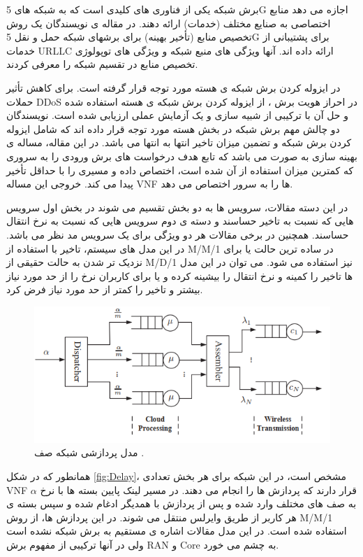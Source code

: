 برش شبکه یکی از فناوری های کلیدی است که به شبکه های 5G اجازه می دهد منابع اختصاصی به صنایع مختلف (خدمات) ارائه دهند.
در مقاله ی
\cite{li2019latency}
نویسندگان یک روش تخصیص منابع (تأخیر بهینه) برای برشهای شبکه حمل و نقل 5G برای پشتیبانی از خدمات URLLC ارائه داده اند.
آنها ویژگی های منبع شبکه و ویژگی های توپولوژی تخصیص منابع در تقسیم شبکه را معرفی کردند.

در 
\citep{vnf1,coreSlice}
ایزوله کردن برش شبکه ی هسته 
مورد توجه قرار گرفته است.
\citep{vnf1}
برای کاهش تأثیر حملات DDoS در احراز هویت برش ، از ایزوله کردن برش شبکه ی هسته استفاده شده و حل آن با ترکیبی از شبیه سازی و یک آزمایش عملی ارزیابی شده است.
نویسندگان
\citep{coreSlice}
دو چالش مهم برش شبکه در بخش هسته مورد توجه قرار داده اند که شامل ایزوله کردن برش شبکه و تضمین میزان تاخیر انتها به انتها می باشد.
در این مقاله، مساله ی بهینه سازی به صورت 
 می باشد که
 تابع هدف درخواست های برش ورودی را به سروری که کمترین میزان استفاده از آن شده است، اختصاص داده و مسیری را با حداقل تأخیر پیدا می کند. خروجی این مساله VNF ها را به سرور اختصاص می دهد.  

در این دسته مقالات، سرویس ها به دو بخش تقسیم می شوند در بخش اول سرویس هایی که  نسبت به تاخیر حساسند و دسته ی دوم سرویس هایی که نسبت به نرخ انتقال حساسند. همچنین در برخی مقالات هر دو ویژگی برای یک سرویس مد نظر می باشد.
در این مدل های سیستم، تاخیر با استفاده از M/M/1 در ساده ترین حالت یا برای نزدیک تر شدن به حالت حقیقی از M/D/1 نیز استفاده می شود. می توان در این مدل ها تاخیر را کمینه و نرخ انتقال را بیشینه کرده و یا 
برای کاربران نرخ را از حد مورد نیاز بیشتر و تاخیر را کمتر از حد مورد نیاز فرض کرد\cite{frdl,luong2018novel,luong2018novel1,guo2016exploiting}.
 \begin{figure}%
  \centering
    \includegraphics[scale = 0.7]{./fig/Delay}
  \caption{مدل پردازشی شبکه صف \cite{frdl}.}
  \label{fig:Delay}
\end{figure}
همانطور که در شکل \eqref{fig:Delay}، مشخص است، در این شبکه برای هر بخش تعدادی VNF قرار دارند که پردازش ها را انجام می دهند. در مسیر لینک پایین
بسته ها با نرخ $\alpha$ به صف های مختلف وارد شده و پس از پردازش با همدیگر ادغام شده و سپس بسته ی هر کاربر از طریق وایرلس منتقل می شوند.
در این پردازش ها، از روش M/M/1 استفاده شده است.
در این مدل مقالات اشاره ی مستقیم به برش شبکه نشده است ولی
در آنها ترکیبی از مفهوم برش RAN و Core به چشم می خورد.
